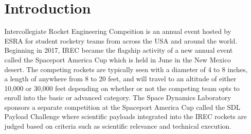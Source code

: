 \documentclass[conference]{IEEEtran} %
\begin{document}
\label{sec:nomenclature}
\newcommand{\nomunit}[1]{%
\renewcommand{\nomentryend}{\hspace*{\fill}#1}}
\renewcommand{\nompreamble}{

  }
\printnomenclature{}



\section{Introduction}
\label{sec:Introduction}

 Intercollegiate Rocket Engineering Compeition is an annual event hosted by ESRA for student rocketry teams from across the USA and around the world.
Beginning in 2017, IREC became the flagship activity of a new annual event called the Spaceport America Cup which is held in June in the New Mexico desert.
The competing rockets are typically seen with a diameter of 4 to 8 inches, a length of anywhere from 8 to 20 feet, and will travel to an altitude of either 10,000 or 30,000
feet depending on whether or not the competing team opts to enroll into the basic or advanced category. The Space Dynamics Laboratory sponsors a separate competition at the
Spaceport America Cup called the SDL Payload Challenge where scientific payloads integrated into the IREC rockets are judged based on criteria such as scientific relevance and technical execution.
\end{document}
